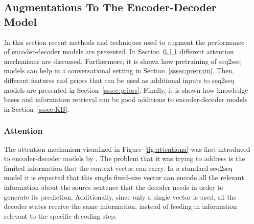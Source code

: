 \documentclass[12pt]{article}
\begin{document}
\subsection{Augmentations To The Encoder-Decoder Model} \label{ssec:32}
In this section recent methods and techniques used to augment the performance of encoder-decoder models are presented. In Section~\ref{sssec:attention} different attention mechanisms are discussed. Furthermore, it is shown how pretraining of seq2seq models can help in a conversational setting in Section~\ref{sssec:pretrain}. Then, different features and priors that can be used as additional inputs to seq2seq models are presented in Section~\ref{sssec:priors}. Finally, it is shown how knowledge bases and information retrieval can be good additions to encoder-decoder models in Section~\ref{sssec:KB}.

\subsubsection{Attention} \label{sssec:attention}
The attention mechanism visualized in Figure~\ref{fig:attentiona} was first introduced to encoder-decoder models by \cite{Bahdanau:2014}. The problem that it was trying to address is the limited information that the context vector can carry. In a standard seq2seq model it is expected that this single fixed-size vector can encode all the relevant information about the source sentence that the decoder needs in order to generate its prediction. Additionally, since only a single vector is used, all the decoder states receive the same information, instead of feeding in information relevant to the specific decoding step. 
\end{document}
